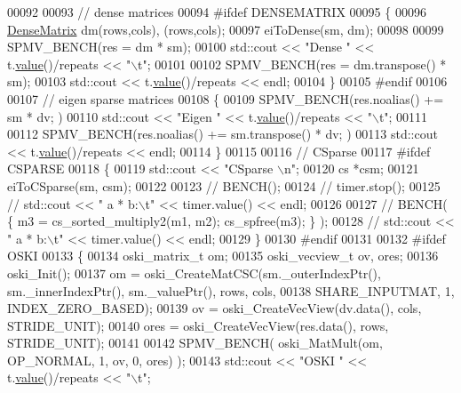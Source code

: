 \begin{DoxyCode}
00092 
00093     \textcolor{comment}{// dense matrices}
00094 \textcolor{preprocessor}{    #ifdef DENSEMATRIX}
00095     \{
00096       \hyperlink{group___core___module}{DenseMatrix} dm(rows,cols), (rows,cols);
00097       eiToDense(sm, dm);
00098 
00099       SPMV\_BENCH(res = dm * sm);
00100       std::cout << \textcolor{stringliteral}{"Dense       "} << t.\hyperlink{class_eigen_1_1_bench_timer_a26760f963ed8b64c126159bfea57735e}{value}()/repeats << \textcolor{stringliteral}{"\(\backslash\)t"};
00101 
00102       SPMV\_BENCH(res = dm.transpose() * sm);
00103       std::cout << t.\hyperlink{class_eigen_1_1_bench_timer_a26760f963ed8b64c126159bfea57735e}{value}()/repeats << endl;
00104     \}
00105 \textcolor{preprocessor}{    #endif}
00106 
00107     \textcolor{comment}{// eigen sparse matrices}
00108     \{
00109       SPMV\_BENCH(res.noalias() += sm * dv; )
00110       std::cout << \textcolor{stringliteral}{"Eigen       "} << t.\hyperlink{class_eigen_1_1_bench_timer_a26760f963ed8b64c126159bfea57735e}{value}()/repeats << \textcolor{stringliteral}{"\(\backslash\)t"};
00111 
00112       SPMV\_BENCH(res.noalias() += sm.transpose() * dv; )
00113       std::cout << t.\hyperlink{class_eigen_1_1_bench_timer_a26760f963ed8b64c126159bfea57735e}{value}()/repeats << endl;
00114     \}
00115 
00116     \textcolor{comment}{// CSparse}
00117 \textcolor{preprocessor}{    #ifdef CSPARSE}
00118     \{
00119       std::cout << \textcolor{stringliteral}{"CSparse \(\backslash\)n"};
00120       cs *csm;
00121       eiToCSparse(sm, csm);
00122 
00123 \textcolor{comment}{//       BENCH();}
00124 \textcolor{comment}{//       timer.stop();}
00125 \textcolor{comment}{//       std::cout << "   a * b:\(\backslash\)t" << timer.value() << endl;}
00126 
00127 \textcolor{comment}{//       BENCH( \{ m3 = cs\_sorted\_multiply2(m1, m2); cs\_spfree(m3); \} );}
00128 \textcolor{comment}{//       std::cout << "   a * b:\(\backslash\)t" << timer.value() << endl;}
00129     \}
00130 \textcolor{preprocessor}{    #endif}
00131 
00132 \textcolor{preprocessor}{    #ifdef OSKI}
00133     \{
00134       oski\_matrix\_t om;
00135       oski\_vecview\_t ov, ores;
00136       oski\_Init();
00137       om = oski\_CreateMatCSC(sm.\_outerIndexPtr(), sm.\_innerIndexPtr(), sm.\_valuePtr(), rows, cols,
00138                              SHARE\_INPUTMAT, 1, INDEX\_ZERO\_BASED);
00139       ov = oski\_CreateVecView(dv.data(), cols, STRIDE\_UNIT);
00140       ores = oski\_CreateVecView(res.data(), rows, STRIDE\_UNIT);
00141 
00142       SPMV\_BENCH( oski\_MatMult(om, OP\_NORMAL, 1, ov, 0, ores) );
00143       std::cout << \textcolor{stringliteral}{"OSKI        "} << t.\hyperlink{class_eigen_1_1_bench_timer_a26760f963ed8b64c126159bfea57735e}{value}()/repeats << \textcolor{stringliteral}{"\(\backslash\)t"};

\end{DoxyCode}
